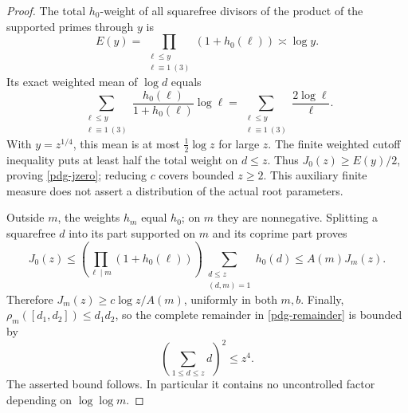 \begin{proof}
The total \(h_0\)-weight of all squarefree divisors of the product of
the supported primes through \(y\) is
\[
 E(y)=\prod_{\substack{\ell\leq y\\\ell\equiv1\ (3)}}
                 (1+h_0(\ell))\asymp\log y.
\]
Its exact weighted mean of \(\log d\) equals
\[
 \sum_{\substack{\ell\leq y\\\ell\equiv1\ (3)}}
        \frac{h_0(\ell)}{1+h_0(\ell)}\log\ell
 =\sum_{\substack{\ell\leq y\\\ell\equiv1\ (3)}}\frac{2\log\ell}{\ell}.
\]
With \(y=z^{1/4}\), this mean is at most \(\tfrac12\log z\) for
large \(z\). The finite weighted cutoff inequality puts at least
half the total weight on \(d\leq z\). Thus \(J_0(z)\geq E(y)/2\),
proving \eqref{pdg-jzero}; reducing \(c\) covers bounded \(z\geq2\).
This auxiliary finite measure does not assert a distribution of
the actual root parameters.

Outside \(m\), the weights \(h_m\) equal \(h_0\); on \(m\) they are
nonnegative. Splitting a squarefree \(d\) into its part supported on
\(m\) and its coprime part proves
\[
 J_0(z)\leq
 \left(\prod_{\ell\mid m}(1+h_0(\ell))\right)
       \sum_{\substack{d\leq z\\(d,m)=1}}h_0(d)
 \leq A(m)J_m(z).
\]
Therefore \(J_m(z)\geq c\log z/A(m)\), uniformly in both \(m,b\).
Finally, \(\rho_m([d_1,d_2])\leq d_1d_2\), so the complete
remainder in \eqref{pdg-remainder} is bounded by
\[
 \left(\sum_{1\leq d\leq z}d\right)^2\leq z^4.
\]
The asserted bound follows. In particular it contains no
uncontrolled factor depending on \(\log\log m\).
\end{proof}

